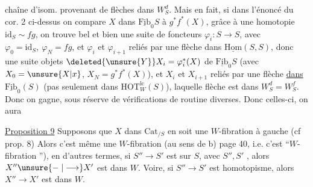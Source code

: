 chaîne d'isom. provenant de flèches dans $W_S^d$. Mais en fait, si  dans l'énoncé du cor. 2 ci-dessus on compare $X$ dans $\underline{\mathrm{Fib}}_0 S$ à $g^*f^*(X)$, grâce à une homotopie
$\mathrm{id}_S\sim fg$, on trouve bel et bien une suite de foncteurs $\varphi_i:S\longrightarrow S$, avec $\varphi_0=\mathrm{id}_S,\ \varphi_N=fg$, et $\varphi_i$ et $\varphi_{i+1}$ reliés par une flèche \unsure{$\psi$} dans $\underline{\mathrm{Hom}}(S,S)$, donc  une suite  objets
$\deleted{\unsure{Y}}X_i=\varphi_i^*(X)$ de $\underline{\mathrm{Fib}}_0 S$ (avec $X_0=\unsure{X|x}$, $X_N=g^*f^*(X)$), et $X_i$ et $X_{i+1}$ reliés par une flèche \uline{dans} $\underline{\mathrm{Fib}}_0(S)$ (pas seulement dans $\mathrm{HOT}_W^{\mathrm{lc}}(S)$), laquelle flèche est dans $W_S^d=W_S^f$. Donc on gagne, sous réserve de vérifications de routine diverses. Donc  celles-ci, on aura

\uline{Proposition 9}  Supposons que $X$ dans $\mathrm{Cat}_{/S}$    en soit une $W$-fibration à gauche (cf prop. 8) Alors c'est même une $W$-fibration (au sens de b) page 40,
i.e.  c'est  ``$W$-fibration ''), en d'autres termes, si $S''\longrightarrow S'$ est  sur $S$, avec $S'',S'$ , alors $X''\unsure{\relbar|\longrightarrow}X'$ est  dans $W$. Voire,  si $S''\longrightarrow S'$ est  homotopisme, alors $X''\longrightarrow X'$ est dans $W$.
